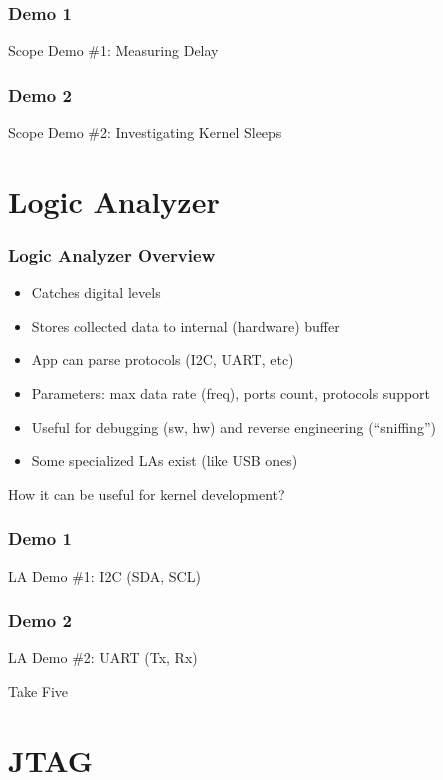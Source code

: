 \documentclass[aspectratio=169,usenames,dvipsnames]{beamer}
\begin{document}
\begin{frame}[standout]
  \frametitle{Demo 1}
  Scope Demo \#1: Measuring Delay
\end{frame}

\begin{frame}[standout]
  \frametitle{Demo 2}
  Scope Demo \#2: Investigating Kernel Sleeps
\end{frame}

\section{Logic Analyzer}

\begin{frame}
  \frametitle{Logic Analyzer Overview}
  \begin{itemize}
    \item Catches digital levels
    \item Stores collected data to internal (hardware) buffer
    \item App can parse protocols (I2C, UART, etc)
    \item Parameters: max data rate (freq), ports count, protocols support
    \item Useful for debugging (sw, hw) and reverse engineering (``sniffing'')
    \item Some specialized LAs exist (like USB ones)
  \end{itemize}
  How it can be useful for kernel development?
\end{frame}

\begin{frame}[standout]
  \frametitle{Demo 1}
  LA Demo \#1: I2C (SDA, SCL)
\end{frame}

\begin{frame}[standout]
  \frametitle{Demo 2}
  LA Demo \#2: UART (Tx, Rx)
\end{frame}

\begin{frame}[standout]
  Take Five
\end{frame}

\section{JTAG}
\end{document}
